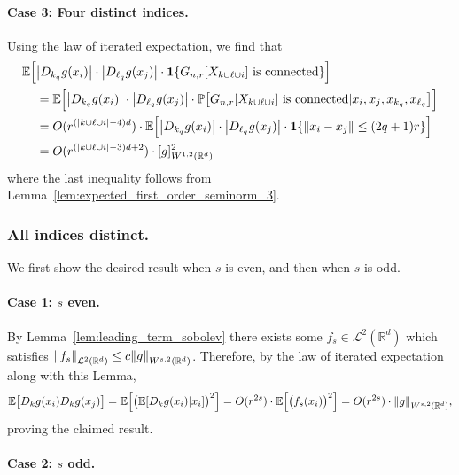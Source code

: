 \documentclass{article}
\newcommand{\Reals}{\mathbb{R}}
\newcommand{\1}{\mathbf{1}}
\newcommand{\Rd}{\Reals^d}
\newcommand{\Leb}{\mathcal{L}}
\newcommand{\Pbb}{\mathbb{P}}
\newcommand{\Ebb}{\mathbb{E}}
\theoremstyle{alden}
\theoremstyle{aldenthm}
\theoremstyle{definition}
\theoremstyle{remark}
\begin{document}
\paragraph{Case 3: Four distinct indices.}
Using the law of iterated expectation, we find that
\begin{align*}
\Ebb\Bigl[ &\abs{D_{k_q}g(x_i)}\cdot{\abs{D_{\ell_q}g(x_j)}} \cdot \1\{G_{n,r}[X_{k \cup \ell \cup i}] ~\textrm{is connected} \}\Bigr] \\
& = \Ebb\Bigl[\abs{D_{k_q}g(x_i)}\cdot{\abs{D_{\ell_q}g(x_j)}} \cdot\Pbb\bigl[G_{n,r}[X_{k \cup \ell \cup i}] ~\textrm{is connected}|x_i,x_j,x_{k_q},x_{\ell_q}\bigr]\Bigr] \\
& = O(r^{(\abs{k \cup \ell \cup i} - 4)d}) \cdot \Ebb\Bigl[\abs{D_{k_q}g(x_i)}\cdot{\abs{D_{\ell_q}g(x_j)}}\cdot\1\{\norm{x_i - x_j} \leq (2q + 1)r\}\Bigr] \\
& = O(r^{(\abs{k \cup \ell \cup i} - 3)d + 2}) \cdot [g]_{W^{1,2}(\Rd)}^2
\end{align*}
where the last inequality follows from Lemma~\ref{lem:expected_first_order_seminorm_3}.

\subsubsection{All indices distinct.}

We first show the desired result when $s$ is even, and then when $s$ is odd. 

\paragraph{Case 1: $s$ even.}

By Lemma~\ref{lem:leading_term_sobolev} there exists some $f_s \in \Leb^2(\Rd)$ which satisfies $\norm{f_s}_{\Leb^2(\Rd)} \leq c \norm{g}_{W^{s,2}(\Rd)}$. Therefore, by the law of iterated expectation along with this Lemma, 
\begin{align*}
\Ebb\bigl[D_kg(x_i)D_kg(x_j)\bigr] = \Ebb\Bigl[\bigl(\Ebb[D_kg(x_i)|x_i]\bigr)^2\Bigr] = O(r^{2s})\cdot \Ebb\Bigl[\bigl(f_s(x_i)\bigr)^2\Bigr] = O(r^{2s}) \cdot \norm{g}_{W^{s,2}(\Rd)},
\end{align*}
proving the claimed result.

\paragraph{Case 2: $s$ odd.}
\end{document}

